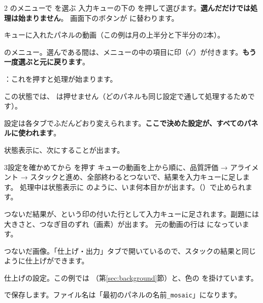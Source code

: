 \begin{step}{2}{ のメニューで  を選ぶ}
  入力キューの下の  を押して選びます。\textbf{選んだだけでは処理は始まりません}。
  画面下のボタンが  に替わります。
\end{step}


\begin{marklist}
  \item キューに入れたパネルの動画（この例は月の上半分と下半分の2本）。
  \item {} のメニュー。選んである間は、メニューの中の項目に印（✓）が付きます。\textbf{もう一度選ぶと元に戻ります}。
  \item {}：これを押すと処理が始まります。
  \item この状態では、 は押せません（どのパネルも同じ設定で通して処理するためです）。
  \item 設定は各タブでふだんどおり変えられます。\textbf{ここで決めた設定が、すべてのパネルに使われます}。
  \item 状態表示に、次にすることが出ます。
\end{marklist}

\begin{step}{3}{設定を確かめてから  を押す}
  キューの動画を上から順に、品質評価 → アライメント → スタックと進め、全部終わるとつないで、結果を入力キューに足します。
  処理中は状態表示に  のように、いま何本目かが出ます。（）で止められます。
\end{step}


\begin{marklist}
  \item つないだ結果が、という印の付いた行として入力キューに足されます。副題には大きさと、つなぎ目のずれ（画素）が出ます。
        元の動画の行は  になっています。
  \item つないだ画像。「仕上げ・出力」タブで開いているので、スタックの結果と同じように仕上げができます。
  \item 仕上げの設定。この例では （第\ref{sec:background}節）と、色の  を掛けています。
  \item {} で保存します。ファイル名は「最初のパネルの名前\texttt{\_mosaic}」になります。
\end{marklist}

